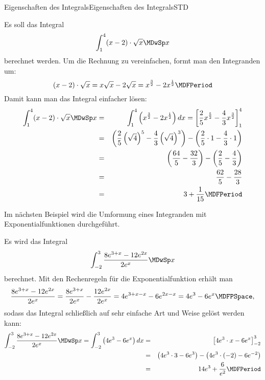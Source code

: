 \begin{MXContent}{Eigenschaften des Integrals}{Eigenschaften des Integrals}{STD}
\begin{MExample}
Es soll das Integral
\[
\int_{1}^{4} (x - 2) \cdot \sqrt{x} \MDwSp x %
\]
berechnet werden. Um die Rechnung zu vereinfachen, formt man den Integranden um:
\[
 (x - 2) \cdot \sqrt{x} = x \sqrt{x} - 2 \sqrt{x} %
 = x^{\frac{3}{2}} - 2 x^{\frac{1}{2}} \MDFPeriod %
\]
Damit kann man das Integral einfacher lösen:
\begin{eqnarray*}
\int_{1}^{4} (x - 2) \cdot \sqrt{x} \MDwSp x %
& = &
\int_{1}^{4} \left(x^{\frac{3}{2}} - 2 x^{\frac{1}{2}}\right) \MD x %
  =  
\left[\frac{2}{5} x^{\frac{5}{2}} - \frac{4}{3} x^{\frac{3}{2}}\right]_{1}^{4} \\
& = &
\left(\frac{2}{5} \left(\sqrt{4}\right)^5 - \frac{4}{3} \left(\sqrt{4}\right)^3 \right) %
 - \left(\frac{2}{5} \cdot 1 - \frac{4}{3} \cdot 1 \right) \\
& = &
\left(\frac{64}{5} - \frac{32}{3}\right) - \left(\frac{2}{5} - \frac{4}{3}\right) \\
& = & \frac{62}{5} - \frac{28}{3} \\
& = & 3 + \frac{1}{15} \MDFPeriod %
\end{eqnarray*}
\end{MExample}

Im nächsten Beispiel wird die Umformung eines Integranden mit 
Exponentialfunktionen durchgeführt.

\begin{MExample}
Es wird das Integral
\[
\int_{-2}^{3} \frac{8 \MEU^{3 + x} - 12 \MEU^{2 x}}{2 \MEU^{x}} \MDwSp x %
\]
berechnet. Mit den Rechenregeln für die Exponentialfunktion erhält man 
\[
\frac{8 \MEU^{3 + x} - 12 \MEU^{2 x}}{2 \MEU^{x}} %
= \frac{8 \MEU^{3 + x}}{2 \MEU^{x}} - \frac{12 \MEU^{2 x}}{2 \MEU^{x}} %
= 4 \MEU^{3 + x - x} - 6 \MEU^{2 x - x} %
= 4 \MEU^{3} - 6 \MEU^{x} \MDFPSpace, %
\]
sodass das Integral schließlich auf sehr einfache Art und Weise gelöst werden 
kann:
\begin{eqnarray*}
\int_{-2}^{3} \frac{8 \MEU^{3 + x} - 12 \MEU^{2 x}}{2 \MEU^{x}} \MDwSp x %
= 
\int_{-2}^{3} \left( 4 \MEU^{3} - 6 \MEU^{x} \right) \MD x %
& = & 
\left[4 \MEU^{3} \cdot x - 6 \MEU^{x} \right]_{-2}^{3} \\
& = & 
\left(4 \MEU^{3} \cdot 3 - 6 \MEU^{3} \right) %
 - \left(4 \MEU^{3} \cdot (-2) - 6 \MEU^{-2} \right) \\
& = &
14 \MEU^{3} + \frac{6}{\MEU^{2}} \MDFPeriod %
\end{eqnarray*}
\end{MExample}


\end{MXContent}
